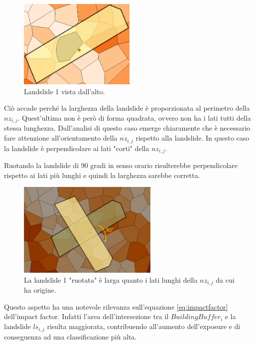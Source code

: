 \begin{figure}[h]
	\centering
	\includegraphics[width=0.5\textwidth]{images/WrongPerimeter}
	\caption{Landslide 1 vista dall'alto. }
	\label{wrongperimeter}
\end{figure}

Ciò accade perché la larghezza della landslide è proporzionata al perimetro della $nz_{i,j}$. Quest'ultima non è però di forma quadrata, ovvero non ha i lati tutti della stessa lunghezza.
Dall'analisi di questo caso emerge chiaramente che è necessario fare attenzione all'orientamento della $nz_{i,j}$ rispetto alla landslide. In questo caso la landslide è  perpendicolare ai lati "corti" della $nz_{i,j}$. 

Ruotando la landslide di 90 gradi in senso orario risulterebbe perpendicolare rispetto ai lati più lunghi e quindi la larghezza sarebbe corretta.

\begin{figure}[h]
	\centering
	\includegraphics[width=0.6\textwidth]{images/LandslideRotation}
	\caption{La landslide 1 "ruotata" è larga quanto i lati lunghi della $nz_{i,j}$ da cui ha origine.}
	\label{landsliderotation}
\end{figure}


Questo aspetto ha una notevole rilevanza sull'equazione \ref{eq:impactfactor} dell'impact factor. Infatti l'area dell'intersezione tra il $BuildingBuffer_i$ e la landslide $ls_{i,j}$ risulta maggiorata, contribuendo all'aumento dell'exposure e di conseguenza ad una classificazione più alta.




